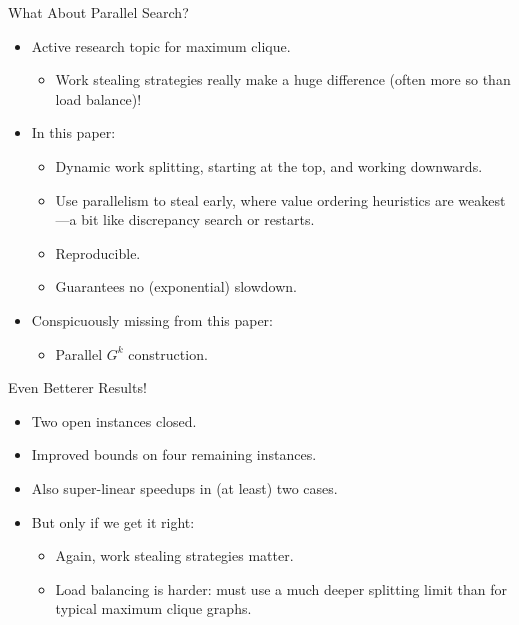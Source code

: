 \documentclass{beamer}
\begin{document}
\begin{frame}{What About Parallel Search?}

    \begin{itemize}
        \item Active research topic for maximum clique.
            \begin{itemize}
                \item Work stealing strategies really make a huge difference (often more so than
                    load balance)!
            \end{itemize}
        \item In this paper:
            \begin{itemize}
                \item Dynamic work splitting, starting at the top, and working downwards.
                \item Use parallelism to steal early, where value ordering heuristics are
                    weakest---a bit like discrepancy search or restarts.
                \item Reproducible.
                \item Guarantees no (exponential) slowdown.
            \end{itemize}
        \item Conspicuously missing from this paper:
            \begin{itemize}
                \item Parallel $G^k$ construction.
            \end{itemize}
    \end{itemize}
\end{frame}

\begin{frame}{Even Betterer Results!}
    \begin{itemize}
        \item Two open instances closed.
        \item Improved bounds on four remaining instances.
        \item Also super-linear speedups in (at least) two cases.
        \item But only if we get it right:
            \begin{itemize}
                \item Again, work stealing strategies matter.
                \item Load balancing is harder: must use a much deeper splitting limit than for
                    typical maximum clique graphs.
            \end{itemize}
    \end{itemize}
\end{frame}
\end{document}
